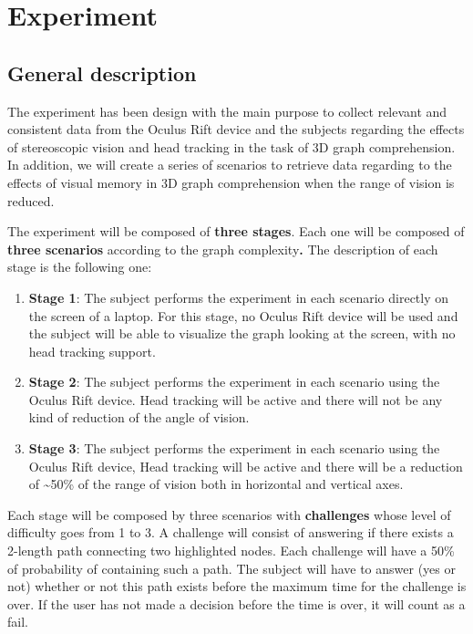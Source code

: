 \chapter{Experiment}

\section{General description}\label{general-description}

The experiment has been design with the main purpose to collect relevant
and consistent data from the Oculus Rift device and the subjects
regarding the effects of stereoscopic vision and head tracking in the
task of 3D graph comprehension. In addition, we will create a series of
scenarios to retrieve data regarding to the effects of visual memory in
3D graph comprehension when the range of vision is reduced.

The experiment will be composed of \textbf{three stages}. Each one will
be composed of \textbf{three scenarios} according to the graph
complexity\textbf{.} The description of each stage is the following one:

\begin{enumerate}
\def\labelenumi{\arabic{enumi}.}
\item
  \textbf{Stage 1}: The subject performs the experiment in each scenario
  directly on the screen of a laptop. For this stage, no Oculus Rift
  device will be used and the subject will be able to visualize the
  graph looking at the screen, with no head tracking support.
\item
  \textbf{Stage 2}: The subject performs the experiment in each scenario
  using the Oculus Rift device. Head tracking will be active and there
  will not be any kind of reduction of the angle of vision.
\item
  \textbf{Stage 3}: The subject performs the experiment in each scenario
  using the Oculus Rift device, Head tracking will be active and there
  will be a reduction of \textasciitilde{}50\% of the range of vision
  both in horizontal and vertical axes.
\end{enumerate}

Each stage will be composed by three scenarios with \textbf{challenges}
whose level of difficulty goes from 1 to 3. A challenge will consist of
answering if there exists a 2-length path connecting two highlighted
nodes. Each challenge will have a 50\% of probability of containing such
a path. The subject will have to answer (yes or not) whether or not this
path exists before the maximum time for the challenge is over. If the
user has not made a decision before the time is over, it will count as a
fail.

